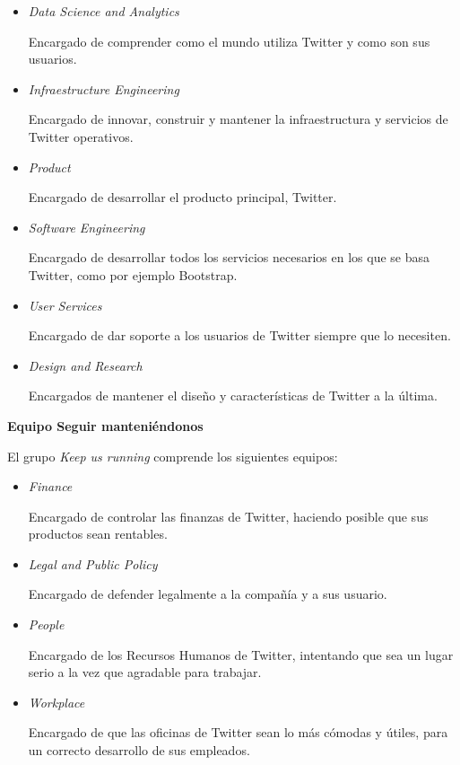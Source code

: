 \begin{itemize}

\item \textit{Data Science and Analytics}

Encargado de comprender como el mundo utiliza Twitter y como son sus usuarios.

\item \textit{Infraestructure Engineering}

Encargado de innovar, construir y mantener la infraestructura y servicios de Twitter operativos.

\item \textit{Product}

Encargado de desarrollar el producto principal, Twitter.

\item \textit{Software Engineering}

Encargado de desarrollar todos los servicios necesarios  en los que se basa Twitter, como por ejemplo Bootstrap.

\item \textit{User Services}

Encargado de dar soporte a los usuarios de Twitter siempre que lo necesiten.

\item \textit{Design and Research}

Encargados de mantener el diseño y características de Twitter a la última.

\end{itemize}

\textbf{Equipo Seguir manteniéndonos}

El grupo \textit{Keep us running} comprende los siguientes equipos:

\begin{itemize}

\item \textit{Finance}

Encargado de controlar las finanzas de Twitter, haciendo posible que sus productos sean rentables.

\item \textit{Legal and Public Policy}

Encargado de defender legalmente a la compañía y a sus usuario. 

\item \textit{People}

Encargado de los Recursos Humanos de Twitter, intentando que sea un lugar serio a la vez que agradable para trabajar.

\item \textit{Workplace}

Encargado de que las oficinas de Twitter sean lo más cómodas y útiles, para un correcto desarrollo de sus empleados.

\end{itemize}

